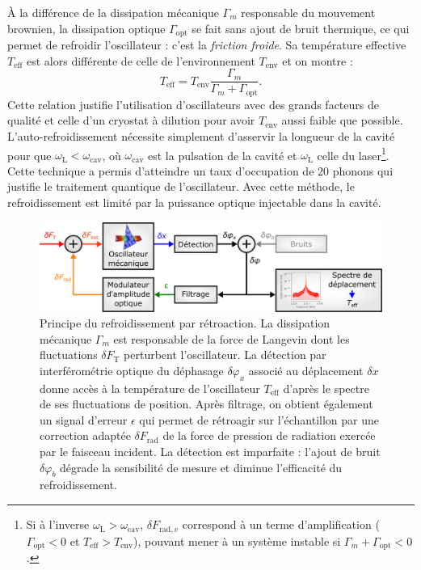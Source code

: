 \documentclass[12pt,a4paper]{article}
\begin{document}
À la différence de la dissipation mécanique $\Gamma_m$ responsable du mouvement brownien, la dissipation optique $\Gamma_\mathrm{opt}$ se fait sans ajout de bruit thermique, ce qui permet de refroidir l'oscillateur : c'est la \textit{friction froide}.
Sa température effective $T_\mathrm{eff}$ est alors différente de celle de l'environnement $T_\mathrm{env}$ et on montre :
\begin{equation}
T_\mathrm{eff} = T_\mathrm{env} \frac{\Gamma_m}{\Gamma_m+\Gamma_\mathrm{opt}}.
\end{equation}
Cette relation justifie l'utilisation d'oscillateurs avec des grands facteurs de qualité et celle d'un cryostat à dilution pour avoir $T_\mathrm{env}$ aussi faible que possible.
L'auto-refroidissement nécessite \og simplement \fg{} d'asservir la longueur de la cavité pour que $\omega_\mathrm{L} < \omega_\mathrm{cav}$, où $\omega_\mathrm{cav}$ est la pulsation de la cavité et $\omega_\mathrm{L}$ celle du laser\footnote{Si à l'inverse $\omega_\mathrm{L} > \omega_\mathrm{cav}$, $\delta F_{\mathrm{rad}, v}$ correspond à un terme d'amplification ($\Gamma_\mathrm{opt} < 0 $ et $T_\mathrm{eff} > T_\mathrm{env}$), pouvant mener à un système instable si $\Gamma_m + \Gamma_\mathrm{opt} < 0$.}.
Cette technique a permis d'atteindre un taux d'occupation de 20 phonons qui justifie le traitement quantique de l'oscillateur.
Avec cette méthode, le refroidissement est limité par la puissance optique injectable dans la cavité.

\begin{figure}
\center
\includegraphics[scale=0.6]{figures/feedback_cooling_v2_small.png}
\caption{Principe du refroidissement par rétroaction.
La dissipation mécanique $\Gamma_m$ est responsable de la force de Langevin dont les fluctuations $\delta F_\mathrm{T}$ perturbent l'oscillateur.
La détection par interférométrie optique du déphasage $\delta \varphi_x$ associé au déplacement $\delta x$ donne accès à la température de l'oscillateur $T_\mathrm{eff}$ d'après le spectre de ses fluctuations de position.
Après filtrage, on obtient également un signal d'erreur $\epsilon$ qui permet de rétroagir sur l'échantillon par une correction adaptée $\delta F_\mathrm{rad}$ de la force de pression de radiation exercée par le faisceau incident.
La détection est imparfaite : l'ajout de bruit $\delta \varphi_b$ dégrade la sensibilité de mesure et diminue l'efficacité du refroidissement.}
\label{fig:feedback_scheme}
\end{figure}
\end{document}
